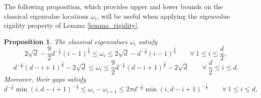 \documentclass[11pt,letterpaper]{article}
\newtheorem{proposition}[theorem]{Proposition}
\begin{document}
%
 The following proposition, which provides upper and lower bounds on the classical eigenvalue locations $\omega_i$, will be useful when applying the eigenvalue rigidity property of Lemma \ref{lemma_rigidity}.
%
\begin{proposition}\label{prop_classical}
The classical eigenvalues $\omega_i$ satisfy
%
\begin{equation}\label{eq_a10}
2\sqrt{d}-  \frac{9}{2}d^{-\frac{1}{6}} (i-1)^{\frac{2}{3}}   \leq \omega_i \leq 2\sqrt{d}- d^{-\frac{1}{6}} (i-1)^{\frac{2}{3}} \qquad \forall \ 1\leq i \leq \frac{d}{2},
\end{equation}
%
\begin{equation}\label{eq_a11}
    d^{-\frac{1}{6}} (d-i+1)^{\frac{2}{3}}  -2\sqrt{d}\leq \omega_{i} \leq  \frac{9}{2}d^{-\frac{1}{6}} (d-i+1)^{\frac{2}{3}} -2\sqrt{d} \qquad \forall \ \frac{d}{2} \leq i \leq d.
\end{equation}
%
Moreover, their gaps satisfy
%
\begin{equation}\label{eq_a12}
d^{-\frac{1}{6}}\min(i, d-i+1)^{-\frac{1}{3}}\leq \omega_i - \omega_{i+1} \leq 2\pi d^{-\frac{1}{6}} \min(i, d-i+1)^{-\frac{1}{3}} \qquad \forall \ 1\leq i \leq d,
\end{equation}


\end{proposition}
\end{document}
